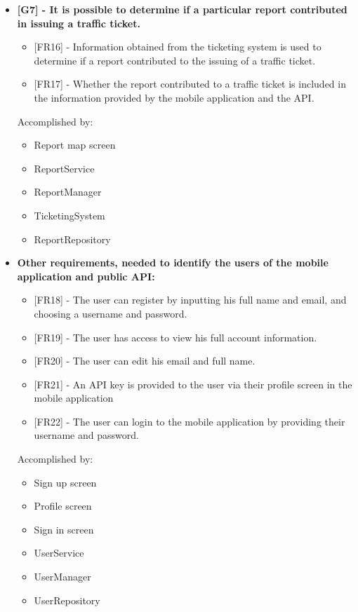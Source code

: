 \begin{itemize}[label={}]
    \item \textbf{[G7] - It is possible to determine if a particular report contributed in issuing a traffic ticket.}
        \begin{itemize}[label={}]
            \item {[FR16]} - Information obtained from the ticketing system is used to determine if a report contributed to the issuing of a traffic ticket.
            \item {[FR17]} - Whether the report contributed to a traffic ticket is included in the information provided by the mobile application and the API.
        \end{itemize}
        Accomplished by:
        \begin{itemize}[label={\textbullet}]
            \item Report map screen
            \item ReportService
            \item ReportManager
            \item TicketingSystem
            \item ReportRepository
        \end{itemize}

    \item \textbf{Other requirements, needed to identify the users of the mobile application and public API:}
        \begin{itemize}[label={}]
            \item {[FR18]} - The user can register by inputting his full name and email, and choosing a username and password.
            \item {[FR19]} - The user has access to view his full account information.
            \item {[FR20]} - The user can edit his email and full name.
            \item {[FR21]} - An API key is provided to the user via their profile screen in the mobile application
            \item {[FR22]} - The user can login to the mobile application by providing their username and password.
        \end{itemize}
        Accomplished by:
        \begin{itemize}[label={\textbullet}]
            \item Sign up screen
            \item Profile screen
            \item Sign in screen
            \item UserService
            \item UserManager
            \item UserRepository
        \end{itemize}


\end{itemize}

